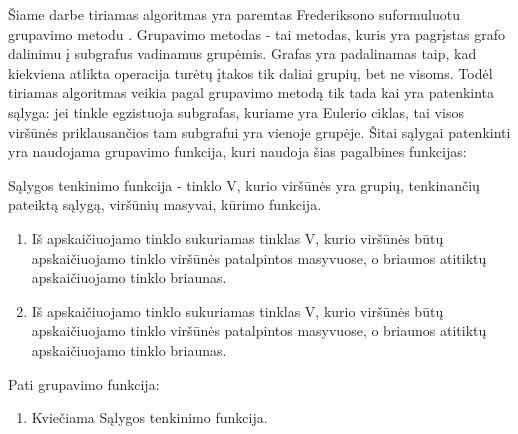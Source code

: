 Šiame darbe tiriamas algoritmas yra paremtas Frederiksono suformuluotu grupavimo metodu \cite{DSfUoMST}. Grupavimo metodas - tai metodas, kuris yra pagrįstas grafo dalinimu į subgrafus vadinamus grupėmis. Grafas yra padalinamas taip, kad kiekviena atlikta operacija turėtų įtakos tik daliai grupių, bet ne visoms. Todėl tiriamas algoritmas veikia pagal grupavimo metodą tik tada kai yra patenkinta sąlyga: jei tinkle egzistuoja subgrafas, kuriame yra Eulerio ciklas, tai visos viršūnės priklausančios tam subgrafui yra vienoje grupėje. Šitai sąlygai patenkinti yra naudojama grupavimo funkcija, kuri naudoja šias pagalbines funkcijas:

Sąlygos tenkinimo funkcija - tinklo V, kurio viršūnės yra grupių, tenkinančių pateiktą sąlygą, viršūnių masyvai, kūrimo funkcija.
\begin{enumerate}
	\item Iš apskaičiuojamo tinklo sukuriamas tinklas V, kurio viršūnės būtų apskaičiuojamo tinklo viršūnės patalpintos masyvuose, o briaunos atitiktų apskaičiuojamo tinklo briaunas.
	\item Iš apskaičiuojamo tinklo sukuriamas tinklas V, kurio viršūnės būtų apskaičiuojamo tinklo viršūnės patalpintos masyvuose, o briaunos atitiktų apskaičiuojamo tinklo briaunas.
\end{enumerate}

Pati grupavimo funkcija:
\begin{enumerate}
	\item Kviečiama Sąlygos tenkinimo funkcija.
\end{enumerate}